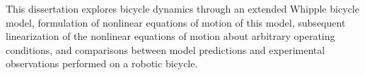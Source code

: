 This dissertation explores bicycle dynamics through an extended Whipple bicycle
model, formulation of nonlinear equations of motion of this model, subsequent
linearization of the nonlinear equations of motion about arbitrary operating
conditions, and comparisons between model predictions and experimental
observations performed on a robotic bicycle.


%
%
%

